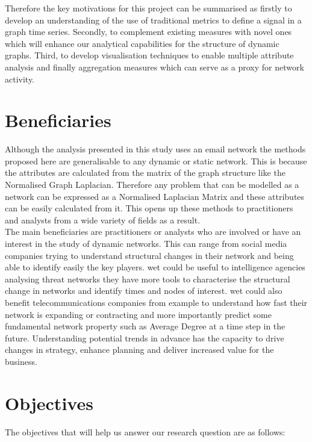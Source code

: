Therefore the key motivations for this project can be summarised as firstly to develop an understanding of the use of traditional metrics to define a signal in a graph time series. Secondly, to complement existing measures with novel ones which will enhance our analytical capabilities for the structure of dynamic graphs. Third, to develop visualisation techniques to enable multiple attribute analysis and finally aggregation measures which can serve as a proxy for network activity. \\

\section{Beneficiaries}
Although the analysis presented in this study uses an email network the methods proposed here are generalisable to any dynamic or static network. This is because the attributes are calculated from the matrix of the graph structure like the Normalised Graph Laplacian. Therefore any problem that can be modelled as a network can be expressed as a Normalised Laplacian Matrix and these attributes can be easily calculated from it. This opens up these methods to practitioners and analysts from a wide variety of fields as a result.\\

The main beneficiaries are practitioners or analysts who are involved or have an interest in the study of dynamic networks. This can range from social media companies trying to understand structural changes in their network and being able to identify easily the key players. wet could be useful to intelligence agencies analysing threat networks they have more tools to characterise the structural change in networks and identify times and nodes of interest. wet could also benefit telecommunications companies from example to understand how fast their network is expanding or contracting and more importantly predict some fundamental network property such as Average Degree at a time step in the future. Understanding potential trends in advance has the capacity to drive changes in strategy, enhance planning and deliver increased value for the business. 

\section{Objectives}
The objectives that will help us answer our research question are as follows:

